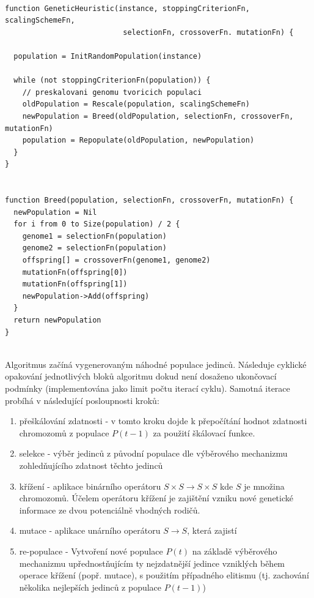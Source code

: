\documentclass[12pt,oneside,a4paper]{article}
\newenvironment{listing}
{\begin{list}{}{\setlength{\leftmargin}{1em}}\item\scriptsize\bfseries}
{\end{list}}
\begin{document}
\begin{listing}
\begin{verbatim}

function GeneticHeuristic(instance, stoppingCriterionFn, scalingSchemeFn, 
                           selectionFn, crossoverFn. mutationFn) {
 
  population = InitRandomPopulation(instance)
 
  while (not stoppingCriterionFn(population)) {
    // preskalovani genomu tvoricich populaci
    oldPopulation = Rescale(population, scalingSchemeFn)
    newPopulation = Breed(oldPopulation, selectionFn, crossoverFn, mutationFn)
    population = Repopulate(oldPopulation, newPopulation)
  }
}
 
 
function Breed(population, selectionFn, crossoverFn, mutationFn) {
  newPopulation = Nil
  for i from 0 to Size(population) / 2 {
    genome1 = selectionFn(population)
    genome2 = selectionFn(population)
    offspring[] = crossoverFn(genome1, genome2)
    mutationFn(offspring[0])
    mutationFn(offspring[1])
    newPopulation->Add(offspring)
  }
  return newPopulation
}


\end{verbatim}
\end{listing}

Algoritmus začíná vygenerovaným náhodné populace jedinců. Následuje cyklické opakování jednotlivých bloků algoritmu dokud není dosaženo ukončovací podmínky (implementována jako limit počtu iterací cyklu). Samotná iterace probíhá v následující posloupnosti kroků:
\begin{enumerate}
\item přeškálování zdatnosti - v tomto kroku dojde k přepočítání hodnot zdatnosti chromozomů z populace $P(t-1)$ za použití škálovací funkce.
\item selekce - výběr jedinců z původní populace dle výběrového mechanizmu zohledňujícího zdatnost těchto jedinců
\item křížení - aplikace binárního operátoru $S \times S \rightarrow S \times S$ kde $S$ je množina chromozomů. Účelem operátoru křížení je zajištění vzniku nové genetické informace ze dvou potenciálně vhodných rodičů.
\item mutace - aplikace unárního operátoru $S \rightarrow S$, která zajistí 
\item re-populace - Vytvoření nové populace $P(t)$ na základě výběrového mechanizmu upřednostňujícím ty nejzdatnější jedince vzniklých během operace křížení (popř. mutace), s použitím případného elitismu (tj. zachování několika nejlepších jedinců z populace $P(t-1)$)
\end{enumerate}
\end{document}
